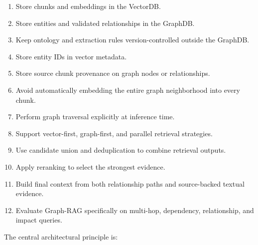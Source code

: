 \documentclass[11pt,a4paper]{article}
\begin{document}
\begin{enumerate}
\item Store chunks and embeddings in the VectorDB.
\item Store entities and validated relationships in the GraphDB.
\item Keep ontology and extraction rules version-controlled outside the GraphDB.
\item Store entity IDs in vector metadata.
\item Store source chunk provenance on graph nodes or relationships.
\item Avoid automatically embedding the entire graph neighborhood into every chunk.
\item Perform graph traversal explicitly at inference time.
\item Support vector-first, graph-first, and parallel retrieval strategies.
\item Use candidate union and deduplication to combine retrieval outputs.
\item Apply reranking to select the strongest evidence.
\item Build final context from both relationship paths and source-backed textual evidence.
\item Evaluate Graph-RAG specifically on multi-hop, dependency, relationship, and impact queries.
\end{enumerate}

The central architectural principle is:

\begin{center}
\end{center}
\end{document}
